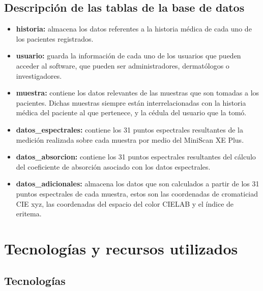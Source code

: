 	\subsection{Descripci\'{o}n de las tablas de la base de datos}
	
		\begin{itemize}
				
				\item \textbf{historia:} almacena los datos referentes a la historia m\'{e}dica de cada uno de los pacientes registrados.
				
				\item \textbf{usuario:} guarda la informaci\'{o}n de cada uno de los usuarios que pueden acceder al software, que pueden ser administradores, dermat\'{o}logos o investigadores.
				
				\item \textbf{muestra:} contiene los datos relevantes de las muestras que son tomadas a los pacientes. Dichas muestras siempre est\'{a}n interrelacionadas con la historia m\'{e}dica del paciente al que pertenece, y la c\'{e}dula del usuario que la tom\'{o}.

				\item \textbf{datos\_espectrales:} contiene los 31 puntos espectrales resultantes de la medici\'{o}n realizada sobre cada muestra por medio del MiniScan XE Plus.
				
				\item \textbf{datos\_absorcion:} contiene los 31 puntos espectrales resultantes del c\'{a}lculo del coeficiente de absorci\'{o}n asociado con los datos espectrales.
				
				\item \textbf{datos\_adicionales:} almacena los datos que son calculados a partir de los 31 puntos espectrales de cada muestra, estos son las coordenadas de cromaticiad CIE xyz, las coordenadas del espacio del color CIELAB y el \'{i}ndice de eritema.
				
		\end{itemize}

\section{Tecnolog\'{i}as y recursos utilizados}

	\subsection{Tecnolog\'{i}as}
	
